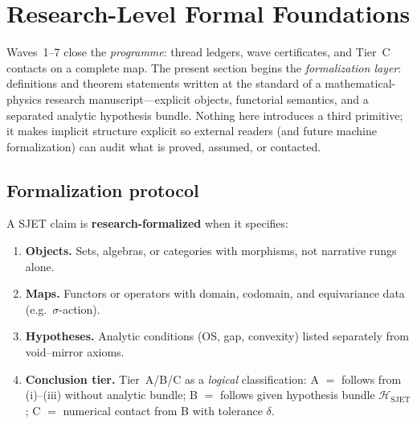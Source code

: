 \section{Research-Level Formal Foundations}
\label{sec:formal-foundations}

Waves~1--7 close the \emph{programme}: thread ledgers, wave certificates, and
Tier~C contacts on a complete map. The present section begins the
\emph{formalization layer}: definitions and theorem statements written at the
standard of a mathematical-physics research manuscript---explicit objects,
functorial semantics, and a separated analytic hypothesis bundle. Nothing here
introduces a third primitive; it makes implicit structure explicit so external
readers (and future machine formalization) can audit what is proved, assumed,
or contacted.

\subsection{Formalization protocol}
\label{sec:formal-foundations:protocol}

\begin{definition}\label{def:formalization}
A SJET claim is \textbf{research-formalized} when it specifies:
\begin{enumerate}[label=(\roman*),leftmargin=*]
  \item \textbf{Objects.} Sets, algebras, or categories with morphisms, not
    narrative rungs alone.
  \item \textbf{Maps.} Functors or operators with domain, codomain, and
    equivariance data (e.g.\ $\sigma$-action).
  \item \textbf{Hypotheses.} Analytic conditions (OS, gap, convexity) listed
    separately from void--mirror axioms.
  \item \textbf{Conclusion tier.} Tier~A/B/C as a \emph{logical} classification:
    A $=$ follows from (i)--(iii) without analytic bundle;
    B $=$ follows given hypothesis bundle $\mathcal{H}_{\mathrm{SJET}}$;
    C $=$ numerical contact from B with tolerance $\delta$.
\end{enumerate}
\end{definition}

